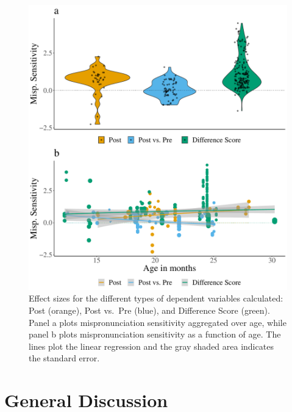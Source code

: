 \documentclass[man]{apa6}
\begin{document}
\begin{figure}
\centering
\includegraphics{VonHolzenBergmann_MPMetaAnalysis_files/figure-latex/Plot-Within-cond-age-diff-score-1.pdf}
\caption{\label{fig:Plot-Within-cond-age-diff-score}Effect sizes for the different types of dependent variables calculated: Post (orange), Post vs.~Pre (blue), and Difference Score (green). Panel a plots mispronunciation sensitivity aggregated over age, while panel b plots mispronunciation sensitivity as a function of age. The lines plot the linear regression and the gray shaded area indicates the standard error.}
\end{figure}

\hypertarget{general-discussion}{%
\section{General Discussion}\label{general-discussion}}
\end{document}
